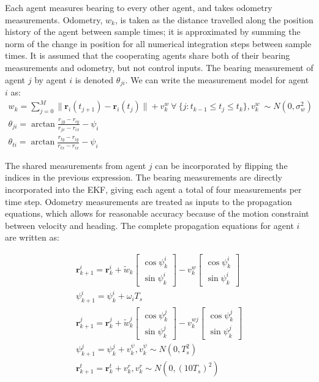 \documentclass{aiaa-tc}
\newcommand{\B}[1]{\textbf{#1}} %
\begin{document}
Each agent measures bearing to every other agent, and takes odometry measurements. Odometry, $w_k$, is taken as the distance travelled along the position history of the agent between sample times; it is approximated by summing the norm of the change in position for all numerical integration steps between sample times. It is assumed that the cooperating agents share both of their bearing measurements and odometry, but not control inputs. The bearing measurement of agent $j$ by agent $i$ is denoted $\theta_{ji}$. We can write the measurement model for agent $i$ as:
\begin{align}
w_k = \sum\limits_{j=0}^{M} \| \B{r}_i(t_{j+1}) - \B{r}_i(t_j) \| + v^w_k \ \forall \ \{j : t_{k-1} \leq t_j \leq t_{k}\}, v^w_k \ \sim N(0,\sigma_w^2) \\
\theta_{ji} = \arctan{\frac{r_{jy}-r_{iy}}{r_{jx}-r_{ix}}} - \psi_i \\
\theta_{ti} = \arctan{\frac{r_{ty}-r_{iy}}{r_{tx}-r_{ix}}} - \psi_i
\end{align}

The shared measurements from agent $j$ can be incorporated by flipping the indices in the previous expression. The bearing measurements are directly incorporated into the EKF, giving each agent a total of four measurements per time step. Odometry measurements are treated as inputs to the propagation equations, which allows for reasonable accuracy because of the motion constraint between velocity and heading. The complete propagation equations for agent $i$ are written as:

\begin{align}
\B{r}^i_{k+1} = \B{r}^i_k + \tilde{w}_k \begin{bmatrix}
\cos{\psi^i_k}\\
\sin{\psi^i_k}
\end{bmatrix} - v^w_k\begin{bmatrix}
\cos{\psi^i_k}\\
\sin{\psi^i_k}
\end{bmatrix}\\
\psi^i_{k+1} = \psi^i_k + \omega_i T_s\\
\B{r}^j_{k+1} = \B{r}^j_k + \tilde{w}^j_k \begin{bmatrix}
\cos{\psi^j_k}\\
\sin{\psi^j_k}
\end{bmatrix} - v^{wj}_k\begin{bmatrix}
\cos{\psi^j_k}\\
\sin{\psi^j_k}
\end{bmatrix}\\
\psi^j_{k+1} = \psi^j_k + v^\psi_k, v^\psi_k \sim N(0,T_s^2)\\
\B{r}^t_{k+1} = \B{r}^t_k + v^r_k, v^r_k \sim N(0,(10T_s)^2)
\end{align}
\end{document}
